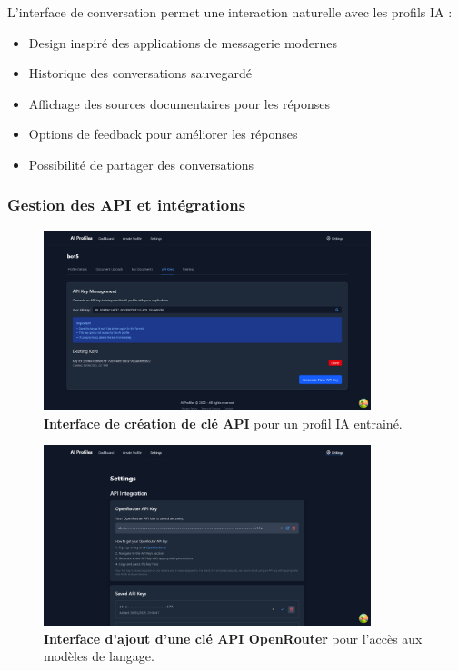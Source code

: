 L'interface de conversation permet une interaction naturelle avec les profils IA :

\begin{itemize}
  \item Design inspiré des applications de messagerie modernes
  \item Historique des conversations sauvegardé
  \item Affichage des sources documentaires pour les réponses
  \item Options de feedback pour améliorer les réponses
  \item Possibilité de partager des conversations
\end{itemize}

\subsubsection{Gestion des API et intégrations}

\begin{figure}[H]
  \centering
  \includegraphics[width=0.85\textwidth,keepaspectratio]{pfe-pics/ai-profile-creation/create_and_api_key_for_trained_profile.png}
  \caption{\textbf{Interface de création de clé API} pour un profil IA entrainé.}
  \label{fig:api_key_creation}
\end{figure}

\begin{figure}[H]
  \centering
  \includegraphics[width=0.85\textwidth,keepaspectratio]{pfe-pics/ai-profile-creation/adding_openRouter_api.png}
  \caption{\textbf{Interface d'ajout d'une clé API OpenRouter} pour l'accès aux modèles de langage.}
  \label{fig:openrouter_api_addition}
\end{figure}

